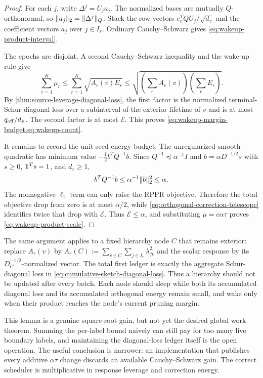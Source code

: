 \begin{proof}
For each $j$, write $\Delta^j=U_ja_j$.  The normalized bases are mutually
$Q$-orthonormal, so
$\lVert a_j\rVert_2=\lVert\Delta^j\rVert_Q$.  Stack the row vectors
$e_v^TQU_j/\sqrt{d_v}$ and the coefficient vectors $a_j$ over
$j\in I_r$.  Ordinary Cauchy--Schwarz gives
\cref{eq:wakeup-product-interval}.

The epochs are disjoint.  A second Cauchy--Schwarz inequality and the wake-up
rule give
\begin{equation*}
 \sum_{r=1}^K\mu_r
 \leq\sum_{r=1}^K\sqrt{A_r(v)E_r}
 \leq
 \sqrt{\left(\sum_rA_r(v)\right)
             \left(\sum_rE_r\right)}.
\end{equation*}
By \cref{thm:source-leverage-diagonal-loss}, the first factor is the
normalized terminal-Schur diagonal loss over a subinterval of the exterior
lifetime of $v$ and is at most $q_{\rm off}/d_v$.  The second factor is at
most $\mathcal E$.  This proves
\cref{eq:wakeup-margin-budget,eq:wakeup-count}.

It remains to record the unit-seed energy budget.  The unregularized smooth
quadratic has minimum value
$-\tfrac12 b^TQ^{-1}b$.  Since
$Q^{-1}\preceq\alpha^{-1}I$ and
$b=\alpha D^{-1/2}s$ with $s\geq0$, $\mathbf{1}^Ts=1$, and $d_v\geq1$,
\begin{equation*}
 b^TQ^{-1}b
 \leq\alpha^{-1}\lVert b\rVert_2^2
 \leq\alpha.
\end{equation*}
The nonnegative $\ell_1$ term can only raise the RPPR objective.  Therefore
the total objective drop from zero is at most $\alpha/2$, while
\cref{eq:orthogonal-correction-telescope} identifies twice that drop with
$\mathcal E$.  Thus $\mathcal E\leq\alpha$, and substituting
$\mu=c\alpha\tau$ proves \cref{eq:wakeup-product-scale}.
\end{proof}

The same argument applies to a fixed hierarchy node $C$ that remains
exterior: replace $A_r(v)$ by
$A_r(C):=\sum_{v\in C}\sum_{j\in I_r}\lambda_{jv}^2$ and the scalar response
by its $D_C^{-1/2}$-normalized vector.  The total first ledger is exactly the
aggregate Schur-diagonal loss in
\cref{eq:cumulative-sketch-diagonal-loss}.  Thus a hierarchy should not be
updated after every batch.  Each node should sleep while both its accumulated
diagonal loss and its accumulated orthogonal energy remain small, and wake
only when their product reaches the node's current pruning margin.

This lemma is a genuine square-root gain, but not yet the desired global work
theorem.  Summing the per-label bound naively can still pay for too many live
boundary labels, and maintaining the diagonal-loss ledger itself is the open
operation.  The useful conclusion is narrower: an implementation that
publishes every additive $\alpha\tau$ change discards an available
Cauchy--Schwarz gain.  The correct scheduler is multiplicative in response
leverage and correction energy.
